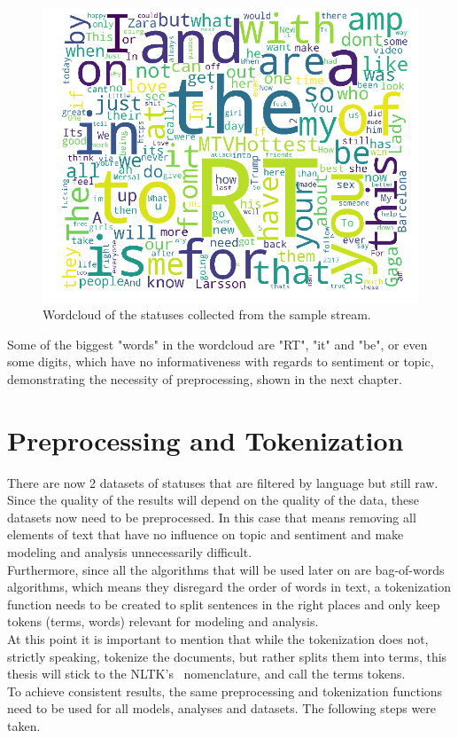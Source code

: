 \begin{figure}
    \centering
    \caption{Wordcloud of the statuses collected from the sample stream.}
    \label{fig:wordloud_pre}
    \includegraphics[width=12cm]{../images/wordcloud_pre.png}
\end{figure}

Some of the biggest "words" in the wordcloud are "RT", "it" and "be",
or even some digits, which have no informativeness with regards to sentiment or topic,
demonstrating the necessity of preprocessing, shown in the next chapter.

\section{Preprocessing and Tokenization}
\label{sec:preprocessingAndTokenization}

There are now 2 datasets of statuses that are filtered by language but still raw.
Since the quality of the results will depend on the quality of the data,
these datasets now need to be preprocessed.
In this case that means removing all elements of text that have no influence on topic and sentiment and make
modeling and analysis unnecessarily difficult.\\
Furthermore, since all the algorithms that will be used later on are bag-of-words algorithms,
which means they disregard the order of words in text, a tokenization function needs to be created
to split sentences in the right places and only keep tokens (terms, words) relevant for modeling and analysis.
\\
At this point it is important to mention that while the tokenization does not, strictly speaking, tokenize the documents,
but rather splits them into terms, this thesis will stick to the NLTK's~\cite{nltkDocs} nomenclature, and call the terms tokens.
\\
To achieve consistent results, the same preprocessing and tokenization functions need to be used for all models, analyses and datasets.
The following steps were taken.

